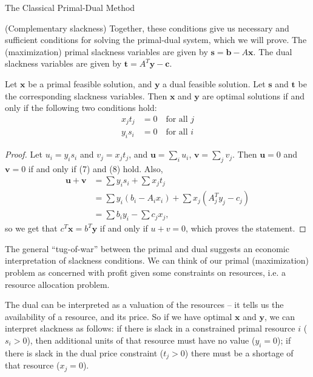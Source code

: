 \begin{section}{The Classical Primal-Dual Method}
\begin{definition}{(Complementary slackness)}
		Together, these conditions give us necessary and 
		sufficient conditions for solving the primal-dual system, which we will prove. The 
		(maximization) primal slackness variables are given by 
		$\mathbf{s} = \mathbf{b} - A\mathbf{x}$. The dual slackness variables are given by 
		$\mathbf{t} = A^{T}\mathbf{y} - \mathbf{c}$.
	\end{definition}
	\begin{theorem}
		Let $\mathbf{x}$ be a primal feasible solution, and $\mathbf{y}$ a dual feasible 
		solution. Let $\mathbf{s}$ and $\mathbf{t}$ be the corresponding slackness variables. 
		Then $\mathbf{x}$ and $\mathbf{y}$ are optimal solutions if and only if the following 
		two conditions hold:
		\begin{align}
			x_jt_j &= 0 \quad \text{for all } j \\
			y_is_i &= 0 \quad \text{for all } i
		\end{align}
	\end{theorem}
	\begin{proof}
		Let $u_i = y_is_i$ and $v_j = x_jt_j$, and $\mathbf{u} = \sum_i u_i$, 
		$\mathbf{v} = \sum_j v_j$. Then $\mathbf{u} = 0$ and $\mathbf{v} = 0$ if and only if 
		(7) and (8) hold. Also, 
		\begin{align*}
			\mathbf{u} + \mathbf{v} &= \sum y_is_i + \sum x_jt_j \\
						&= \sum y_i(b_i - A_ix_i) + \sum x_j (A^{T}_jy_j-c_j)\\
						&= \sum b_iy_i - \sum c_jx_j,
		\end{align*}
		so we get that $c^{T}\mathbf{x} = b^{T}\mathbf{y}$ if and only if $u + v = 0$, which 
		proves the statement.	
	\end{proof}
	The general ``tug-of-war'' between the primal and dual suggests an economic interpretation 
	of slackness conditions. We can think of our primal (maximization) problem as concerned with 
	profit given some constraints on resources, i.e. a resource allocation problem. 
	
	The dual can 
	be interpreted as a valuation of the resources -- it tells us the availability of a resource, 
	and its price. So if we have optimal $\mathbf{x}$ and $\mathbf{y}$, we can interpret 
	slackness as follows: if there is slack in a constrained primal resource $i$ ($s_i > 0$), 
	then additional units of that resource must have no value ($y_i = 0$); if there is slack 
	in the dual price constraint ($t_j > 0$) there must be a shortage of that resource ($x_j = 0$).


\end{section}
